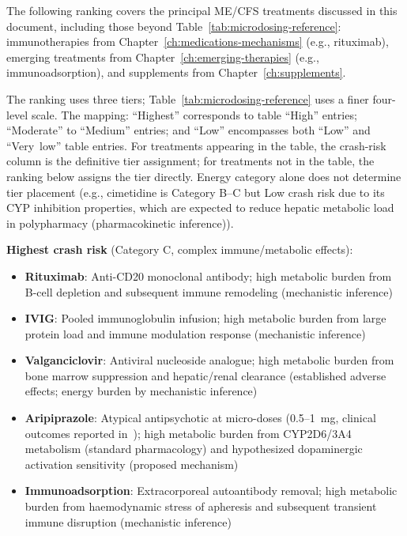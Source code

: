 The following ranking covers the principal ME/CFS treatments discussed in this document, including those beyond Table~\ref{tab:microdosing-reference}: immunotherapies from Chapter~\ref{ch:medications-mechanisms} (e.g., rituximab), emerging treatments from Chapter~\ref{ch:emerging-therapies} (e.g., immunoadsorption), and supplements from Chapter~\ref{ch:supplements}.

The ranking uses three tiers; Table~\ref{tab:microdosing-reference} uses a finer four-level scale. The mapping: ``Highest'' corresponds to table ``High'' entries; ``Moderate'' to ``Medium'' entries; and ``Low'' encompasses both ``Low'' and ``Very~low'' table entries. For treatments appearing in the table, the crash-risk column is the definitive tier assignment; for treatments not in the table, the ranking below assigns the tier directly. Energy category alone does not determine tier placement (e.g., cimetidine is Category B--C but Low crash risk due to its CYP inhibition properties, which are expected to reduce hepatic metabolic load in polypharmacy (pharmacokinetic inference)).

\textbf{Highest crash risk} (Category C, complex immune/metabolic effects):
\begin{itemize}
    \item \textbf{Rituximab}: Anti-CD20 monoclonal antibody; high metabolic burden from B-cell depletion and subsequent immune remodeling (mechanistic inference)
    \item \textbf{IVIG}: Pooled immunoglobulin infusion; high metabolic burden from large protein load and immune modulation response (mechanistic inference)
    \item \textbf{Valganciclovir}: Antiviral nucleoside analogue; high metabolic burden from bone marrow suppression and hepatic/renal clearance (established adverse effects; energy burden by mechanistic inference)
    \item \textbf{Aripiprazole}: Atypical antipsychotic at micro-doses (0.5--1~mg, clinical outcomes reported in~\cite{Crosby2021LDA}); high metabolic burden from CYP2D6/3A4 metabolism (standard pharmacology) and hypothesized dopaminergic activation sensitivity (proposed mechanism)
    \item \textbf{Immunoadsorption}: Extracorporeal autoantibody removal; high metabolic burden from haemodynamic stress of apheresis and subsequent transient immune disruption (mechanistic inference)
\end{itemize}

